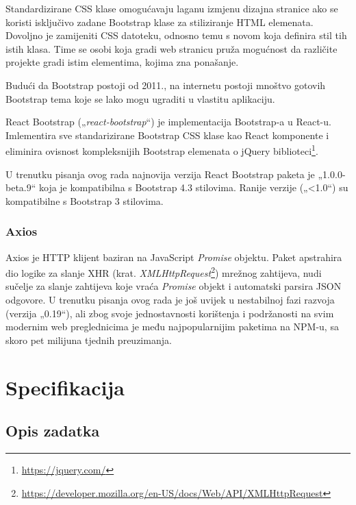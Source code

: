\documentclass[times, utf8, diplomski, numeric]{fer}
\newcommand{\razmakp}{\vspace{18pt}}
\begin{document}
Standardizirane CSS klase omogućavaju laganu izmjenu dizajna stranice ako se koristi isključivo zadane Bootstrap klase za stiliziranje HTML elemenata.
Dovoljno je zamijeniti CSS datoteku, odnosno temu s novom koja definira stil tih istih klasa.
Time se osobi koja gradi web stranicu pruža mogućnost da različite projekte gradi istim elementima, kojima zna ponašanje.

Budući da Bootstrap postoji od 2011.\citep{wiki_bs}, na internetu postoji mnoštvo gotovih Bootstrap tema koje se lako mogu ugraditi u vlastitu aplikaciju.

\razmakp

React Bootstrap („\emph{react-bootstrap}“) je implementacija Bootstrap-a u React-u.
Imlementira sve standarizirane Bootstrap CSS klase kao React komponente i eliminira ovisnost kompleksnijih Bootstrap elemenata o jQuery biblioteci\footnote{\url{https://jquery.com/}}.

U trenutku pisanja ovog rada najnovija verzija React Bootstrap paketa je „1.0.0-beta.9“ koja je kompatibilna s Bootstrap 4.3 stilovima.
Ranije verzije („<1.0“) su kompatibilne s Bootstrap 3 stilovima\citep{bs_react}.


\subsection{Axios}

Axios je HTTP klijent baziran na JavaScript \emph{Promise} objektu.
Paket apstrahira dio logike za slanje XHR (krat. \emph{XMLHttpRequest}\footnote{\url{https://developer.mozilla.org/en-US/docs/Web/API/XMLHttpRequest}}) mrežnog zahtijeva, nudi sučelje za slanje zahtijeva koje vraća \emph{Promise} objekt i automatski parsira JSON odgovore.
U trenutku pisanja ovog rada je još uvijek u nestabilnoj fazi razvoja (verzija „0.19“), ali zbog svoje jednostavnosti korištenja i podržanosti na svim modernim web preglednicima je među najpopularnijim paketima na NPM-u, sa skoro pet milijuna tjednih preuzimanja\citep{axios}.



\chapter{Specifikacija}


\section{Opis zadatka}
\end{document}
